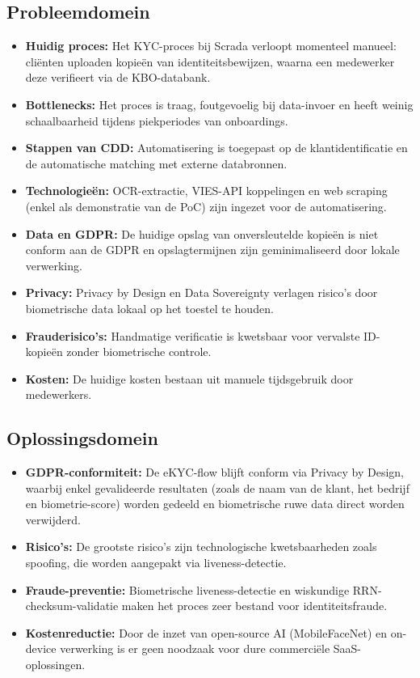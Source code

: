 \subsection{Probleemdomein}
\begin{itemize}
    \item \textbf{Huidig proces:} Het KYC-proces bij Scrada verloopt momenteel manueel: cliënten uploaden kopieën van identiteitsbewijzen, waarna een medewerker deze verifieert via de KBO-databank.
    \item \textbf{Bottlenecks:} Het proces is traag, foutgevoelig bij data-invoer en heeft weinig schaalbaarheid tijdens piekperiodes van onboardings.
    \item \textbf{Stappen van CDD:} Automatisering is toegepast op de klantidentificatie en de automatische matching met externe databronnen.
    \item \textbf{Technologieën:} OCR-extractie, VIES-API koppelingen en web scraping (enkel als demonstratie van de PoC) zijn ingezet voor de automatisering.
    \item \textbf{Data en GDPR:} De huidige opslag van onversleutelde kopieën is niet conform aan de GDPR en opslagtermijnen zijn geminimaliseerd door lokale verwerking.
    \item \textbf{Privacy:} Privacy by Design en Data Sovereignty verlagen risico's door biometrische data lokaal op het toestel te houden.
    \item \textbf{Frauderisico's:} Handmatige verificatie is kwetsbaar voor vervalste ID-\-kopieën zonder biometrische controle.
    \item \textbf{Kosten:} De huidige kosten bestaan uit manuele tijdsgebruik door medewerkers.
\end{itemize}

\subsection{Oplossingsdomein}
\begin{itemize}
    \item \textbf{GDPR-conformiteit:} De eKYC-flow blijft conform via Privacy by Design, waarbij enkel gevalideerde resultaten (zoals de naam van de klant, het bedrijf en biometrie-score) worden gedeeld en biometrische ruwe data direct worden verwijderd.
    \item \textbf{Risico's:} De grootste risico's zijn technologische kwetsbaarheden zoals spoofing, die worden aangepakt via liveness-detectie.
    \item \textbf{Fraude-preventie:} Biometrische liveness-detectie en wiskundige RRN-checksum-validatie maken het proces zeer bestand voor identiteitsfraude.
    \item \textbf{Kostenreductie:} Door de inzet van open-source AI (MobileFaceNet) en on-device verwerking is er geen noodzaak voor dure commerciële SaaS-oplossingen.
\end{itemize}

